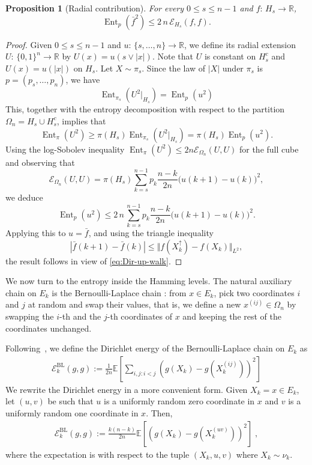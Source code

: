 \documentclass[12pt,final]{amsart}
\newcommand{\1}{\mathbf{1}}
\newtheorem{proposition}[theorem]{Proposition}
\newcommand{\Ent}{\operatorname{Ent}}
\newcommand{\Ecal}{\mathcal{E}}
\newcommand{\R}{\mathbb{R}}
\begin{document}
\begin{proposition}[Radial contribution]
\label{prop:radial-contribution}
For every $0\leq s\le n-1$ and $f:\, H_s\to \R$, 
$$
\Ent_{p}(\bar{f}^2)\leq  2\,n\, \Ecal_{H_s}(f,f).
$$
\end{proposition}
\begin{proof}
Given $0\leq s\le n-1$ and $u:\, \{s,\ldots, n\}\to \R$, we define its radial extension $U:\, \{0,1\}^n\to \R$ by $U(x)= u(s\vee |x|)$. Note that $U$ is constant on $H_s^c$ and $U(x)=u(|x|)$ on $H_s$. Let $X\sim \pi_s$. Since the law of $|X|$ under $\pi_s$ is $p=(p_s,\ldots,p_n)$, we have 
$$
\Ent_{\pi_s}(U^2\vert_{H_s})= \Ent_{p}(u^2)
$$
This, together with the entropy decomposition with respect to the partition $\Omega_n=H_s\cup H_s^c$, implies that  
$$
\Ent_{\pi}(U^2)\geq \pi(H_s)\Ent_{\pi_s}(U^2\vert_{H_s})= \pi(H_s) \Ent_{p}(u^2).
$$
Using the log-Sobolev inequality $\Ent_{\pi}(U^2)\leq 2n\Ecal_{\Omega_n}(U, U)$ for the full cube~\cite[Theorem 5.1]{BLM} and observing that 
$$
\Ecal_{\Omega_n}(U,U)= \pi(H_s) \sum_{k=s}^{n-1} p_k \frac{n-k}{2n} \big(u(k+1)-u(k)\big)^2,
$$
we deduce 
$$
\Ent_{p}(u^2)\leq 2\,n\,\sum_{k=s}^{n-1} p_k \frac{n-k}{2n} \big(u(k+1)-u(k)\big)^2. 
$$
Applying this to $u=\bar{f}$, and using the triangle inequality 
$$
|\bar{f}(k+1)-\bar{f}(k)|\leq  \Vert f(X_k^{\uparrow})-f(X_k)\Vert_{L^2},
$$
the result follows in view of \eqref{eq:Dir-up-walk}.

\end{proof}
We now turn to the entropy inside the Hamming levels. The natural auxiliary chain on $E_k$ is the Bernoulli-Laplace chain \cite[Section XV.2]{Feller1}: from $x\in E_k$, pick two coordinates $i$ and $j$ at random and swap their values, that is, we define a new $x^{(ij)}\in \Omega_n$ by swapping the $i$-th and the $j$-th coordinates of $x$ and keeping the rest of the coordinates unchanged. 

Following~\cite{LeeYau}, we define the Dirichlet energy of the Bernoulli-Laplace chain on $E_k$ as
\begin{align*}
    \Ecal^{\operatorname{BL}}_{k}(g,g):=\frac{1}{2n}\mathbb{E}\left[\sum_{i,j: i<j}\left(g(X_k)-g(X^{(ij)}_k)\right)^2\right]
\end{align*}
We rewrite the Dirichlet energy in a more convenient form. Given $X_k=x\in E_{k}$, let $(u, v)$ be such that $u$ is a uniformly random zero coordinate in $x$ and $v$ is a uniformly random one coordinate in $x$. Then, 
\begin{align}
\label{eqn:BL-Dir}
    \Ecal^{\operatorname{BL}}_{k}(g,g):=\frac{k(n-k)}{2n}\mathbb{E}\left[\left(g(X_k)-g(X^{(uv)}_k)\right)^2\right]\;,
\end{align}
where the expectation is with respect to the tuple $(X_k,u,v)$ where $X_k\sim \nu_k$. 
\end{document}

